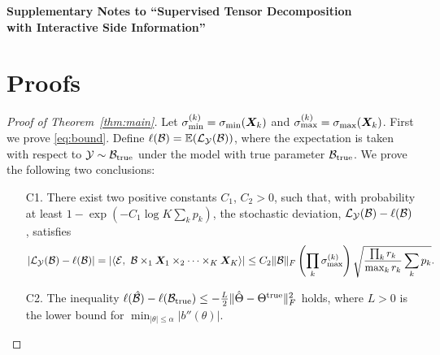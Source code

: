 \documentclass[12pt]{article}
\theoremstyle{definition}
\theoremstyle{definition}
\begin{document}
\def\spacingset#1{\renewcommand{\baselinestretch}%
{#1}\small\normalsize} \spacingset{1}



\begin{center}
{\large\bf Supplementary Notes to ``Supervised Tensor Decomposition \\
with Interactive Side Information''}
\end{center}

\appendix
\renewcommand{\thefigure}{S\arabic{figure}}
\setcounter{figure}{0}   

\section{Proofs}\label{sec:appedix}
\begin{proof}[Proof of Theorem~\ref{thm:main}]
Let $\sigma_{\text{min}}^{(k)} = \sigma_{\text{min}}(\bm X_k)$ and  $\sigma_{\text{max}}^{(k)} = \sigma_{\text{max}}(\bm X_k)$. First we prove \eqref{eq:bound}. 
Define $\ell(\mathcal{B})=\mathbb{E}(\mathcal{L}_{\mathcal{Y}}(\mathcal{B}))$, where the expectation is taken with respect to $\mathcal{Y}\sim \mathcal{B}_{\textup{true}}$ under the model with true parameter $\mathcal{B}_{\textup{true}}$. We prove the following two conclusions:
\begin{enumerate}
\item[C1.] There exist two positive constants $C_1$, $C_2>0$, such that, with probability at least $1-\exp(-C_1\log K\sum_k p_k)$, the stochastic deviation, $\mathcal{L}_{\mathcal{Y}}(\mathcal{B})-\ell(\mathcal{B})$, satisfies
\[
|\tL_{\tY}(\tB)-\ell(\tB)|=|\langle \tE,\ \tB\times_1\mX_1\times_2\cdots\times_K \mX_K\rangle| \leq C_2\FnormSize{}{\tB} \left(\prod_k \sigma_{\text{max}}^{(k)}\right)\sqrt{{\prod_k r_k \over \max_k r_k} \sum_k p_k}.
\]
\item[C2.] The inequality $\ell(\hat {\mathcal{B}}) - \ell(\mathcal{B}_{\textup{true}}) \leq  -{L\over 2}\lVert\hat \Theta-\Theta^{\text{true}}\rVert_F^2$ holds, where $L>0$ is the lower bound for $\min_{|\theta|\leq \alpha}|b''(\theta)|$. 
\end{enumerate}


\end{proof}
\end{document}
